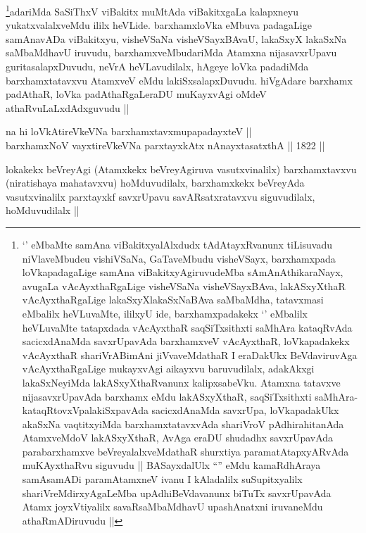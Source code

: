 \begin{artha}
\footnote[1]{`\stext' eMbaMte samAna viBakitxyalAlxdudx
tAdAtayxRvanunx tiLisuvadu niVlaveMbudeu vishiVSaNa, GaTaveMbudu
visheVSayx, barxhamxpada loVkapadagaLige samAna
viBakitxyAgiruvudeMba sAmAnAthikaraNayx, avugaLa vAcAyxthaRgaLige
visheVSaNa visheVSayxBAva, lakASxyXthaR vAcAyxthaRgaLige
lakaSxyXlakaSxNaBAva saMbaMdha, tatavxmasi eMbalilx heVLuvaMte,
ililxyU ide, barxhamxpadakekx `\stext' eMbalilx heVLuvaMte
tatapxdada vAcAyxthaR saqSiTxsithxti saMhAra kataqRvAda
sacicxdAnaMda savxrUpavAda barxhamxveV vAcAyxthaR, loVkapadakekx
vAcAyxthaR shariVrABimAni jiVvaveMdathaR I eraDakUkx BeVdaviruvAga
vAcAyxthaRgaLige mukayxvAgi aikayxvu baruvudilalx, adakAkxgi
lakaSxNeyiMda lakASxyXthaRvanunx kalipxsabeVku. Atamxna tatavxve
nijasavxrUpavAda barxhamx eMdu lakASxyXthaR, saqSiTxsithxti
saMhAra-kataqRtovxVpalakiSxpavAda sacicxdAnaMda savxrUpa,
loVkapadakUkx akaSxNa vaqtitxyiMda barxhamxtatavxvAda shariVroV
pAdhirahitanAda AtamxveMdoV lakASxyXthaR, AvAga eraDU shudadhx
savxrUpavAda parabarxhamxve beVreyalalxveMdathaR shurxtiya
paramatAtapxyARvAda muKAyxthaRvu siguvudu || BASayxdalUlx ``\stext''
eMdu kamaRdhAraya samAsamADi paramAtamxneV ivanu I kAladalilx
suSupitxyalilx shariVreMdirxyAgaLeMba upAdhiBeVdavanunx biTuTx
savxrUpavAda Atamx joyxVtiyalilx savaRsaMbaMdhavU upashAnatxni
iruvaneMdu athaRmADiruvudu ||}adariMda SaSiThxV viBakitx muMtAda viBakitxgaLa
kalapxneyu yukatxvalalxveMdu ililx heVLide. barxhamxloVka eMbuva
padagaLige samAnavADa viBakitxyu, visheVSaNa visheVSayxBAvaU, lakaSxyX
lakaSxNa saMbaMdhavU iruvudu, barxhamxveMbudariMda Atamxna
nijasavxrUpavu guritasalapxDuvudu, neVrA heVLavudilalx, hAgeye loVka
padadiMda barxhamxtatavxvu AtamxveV eMdu lakiSxsalapxDuvudu. hiVgAdare
barxhamx padAthaR, loVka padAthaRgaLeraDU muKayxvAgi oMdeV
athaRvuLaLxdAdxguvudu ||                                              
\end{artha}

\begin{shl}
na hi loVkAtireVkeVNa barxhamxtavxmupapadayxteV ||  \\
barxhamxNoV vayxtireVkeVNa parxtayxkAtx nAnayxtasatxthA ||  1822 ||  
\end{shl}

\begin{artha}
lokakekx beVreyAgi (Atamxkekx beVreyAgiruva vasutxvinalilx)
barxhamxtavxvu (niratishaya mahatavxvu) hoMduvudilalx, barxhamxkekx
beVreyAda vasutxvinalilx parxtayxkf savxrUpavu savARsatxratavxvu
siguvudilalx, hoMduvudilalx ||
\end{artha}

